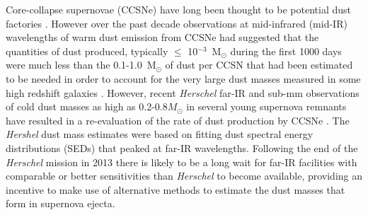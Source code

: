 \documentclass[useAMS,usenatbib,usegraphicx]{mnras}
\begin{document}
%   

Core-collapse supernovae (CCSNe) have long been thought to be potential 
dust factories \citep{Hoyle1970, Kozasa1991, Todini2001}. However 
over the past decade observations at mid-infrared (mid-IR) wavelengths of 
warm dust emission from CCSNe had suggested that the quantities of dust 
produced, typically $\leq$ 10$^{-3}$~M$_\odot$ during the first 1000 days 
\citep{Sugerman2006, Meikle2007, Kotak2009, Andrews2010, Fabbri2011} were 
much less than the 0.1-1.0~M$_\odot$ of dust per CCSN that had been 
estimated to be needed \citep{Morgan2003, Dwek2007} in order to account 
for the very large dust masses measured in some high redshift galaxies 
\citep{Omont2001, Bertoldi2003, Watson2015}. However, recent {\em 
Herschel} far-IR and sub-mm observations of cold dust masses as high as 
0.2-0.8$M_{\odot}$ in several young supernova remnants have resulted in a 
re-evaluation of the rate of dust production by CCSNe \citep{Barlow2010, 
Matsuura2011, Gomez2012}. The {\em Hershel} dust mass estimates were based 
on fitting dust spectral energy distributions (SEDs) that peaked at far-IR 
wavelengths. Following the end of the {\em Herschel} mission in 
2013 there is likely to be a long wait for far-IR facilities with 
comparable or better sensitivities than {\em Herschel} to become 
available, providing an incentive to make use of alternative methods to 
estimate the dust masses that form in supernova ejecta.
\end{document}
